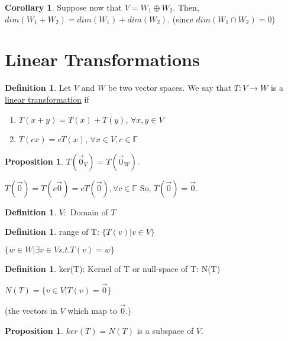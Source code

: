 \documentclass[a5paper]{article}
\makeatletter
\renewenvironment{proof}{{\bfseries Proof}}{\qed}
\renewenvironment{proof}[1][\bfseries \proofname]{\par
  \pushQED{\qed}%
  \normalfont \topsep6\p@\@plus6\p@\relax
  \trivlist
  \item[\hskip\labelsep
        \scshape
    #1\@addpunct{}]\ignorespaces
}{%
  \popQED\endtrivlist\@endpefalse
}
\theoremstyle{definition}%
\numberwithin{theorem}{section} %
\newtheorem{corollary}[theorem]{Corollary}
\newtheorem{definition}[theorem]{Definition}
\newtheorem{proposition}[theorem]{Proposition}
\newcommand{\F}{\mathbb{F}}
\makeatother
\begin{document}
\begin{corollary}
Suppose now that $V = W_1 \oplus W_2$. Then, $dim(W_1 + W_2) = dim(W_1) + dim(W_2)$. (since $dim(W_1 \cap W_2) = 0$)
\end{corollary}

\section{Linear Transformations}

\begin{definition}
Let $V$ and $W$ be two vector spaces. We say that $T: V \to W$ is a \underline{linear transformation} if 
\begin{enumerate}
\item $T(x+y) = T(x) + T(y)$, $\forall x,y \in V$
\item $T(cx) = cT(x)$, $\forall x \in V, c \in \F$
\end{enumerate}
\end{definition}

\begin{proposition}
$T(\vec{0}_V) = T(\vec{0}_W)$.
\begin{proof}
$T(\vec{0}) = T(c\vec{0}) = cT(\vec{0}), \forall c \in \F$
So, $T(\vec{0}) = \vec{0}$.
\end{proof}
\end{proposition}

\begin{definition}
$V:$ Domain of $T$


\end{definition}

\begin{definition}
 range of T: $\{T(v) | v \in V\}$
 
 $\{w \in W | \exists v \in V s.t. T(v)=w\}$
\end{definition}

\begin{definition}
ker(T): Kernel of T or null-space of T: N(T)

$N(T) = \{v \in V | T(v) = \vec{0}\}$

(the vectors in $V$ which map to $\vec{0}$.)

\end{definition}

\begin{proposition}
$ker(T) = N(T)$ is a subspace of $V$.
\end{proposition}
\end{document}
